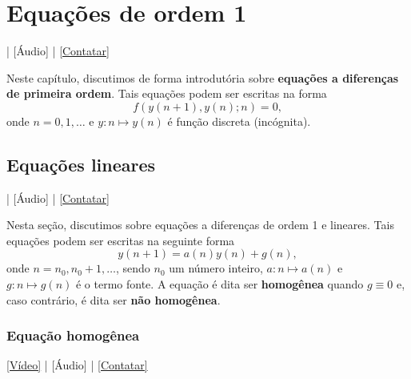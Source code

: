 
\chapter{Equações de ordem 1}\label{cap_ead1}

\begin{flushright}
  [Vídeo] | [Áudio] | \href{https://phkonzen.github.io/notas/contato.html}{[Contatar]}
\end{flushright}

Neste capítulo, discutimos de forma introdutória sobre {\bf equações a diferenças de primeira ordem}. Tais equações podem ser escritas na forma
\begin{equation}
  f\left(y(n+1),y(n);n\right)=0,
\end{equation}
onde $n=0, 1, \ldots$ e $y:n\mapsto y(n)$ é função discreta (incógnita).

\section{Equações lineares}\label{cap_ead1_sec_eqlin}

\begin{flushright}
  [Vídeo] | [Áudio] | \href{https://phkonzen.github.io/notas/contato.html}{[Contatar]}
\end{flushright}

Nesta seção, discutimos sobre equações a diferenças de ordem 1 e lineares. Tais equações podem ser escritas na seguinte forma
\begin{equation}
  y(n+1) = a(n)y(n) + g(n),
\end{equation}
onde $n=n_0, n_0+1, \ldots$, sendo $n_0$ um número inteiro, $a:n\mapsto a(n)$ e $g:n\mapsto g(n)$ é o termo fonte. A equação é dita ser {\bf homogênea} quando $g\equiv 0$ e, caso contrário, é dita ser {\bf não homogênea}.

\subsection{Equação homogênea}

\begin{flushright}
  \href{https://archive.org/details/ead-o1h}{[Vídeo]} | [Áudio] | \href{https://phkonzen.github.io/notas/contato.html}{[Contatar]}
\end{flushright}

